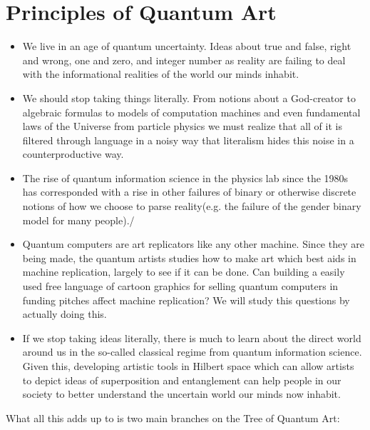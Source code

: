 \documentclass[11pt]{article}
\begin{document}
\section{
Principles of Quantum Art}
\begin{itemize}

    \item
We live in an age of quantum uncertainty.  Ideas about true and false, right and wrong, one and zero, and integer number as reality are failing to deal with the informational realities of the world our minds inhabit. 
    
    \item
We should stop taking things literally.  From notions about a God-creator to algebraic formulas to models of computation machines and even fundamental laws of the Universe from particle physics we must realize that all of it is filtered through language in a noisy way that literalism hides this noise in a counterproductive way.
    \item
The rise of quantum information science in the physics lab since the 1980s has corresponded with a rise in other failures of binary or otherwise discrete notions of how we choose to parse reality(e.g. the failure of the gender binary model for many people)./
    \item

        Quantum computers are art replicators like any other machine.  Since they are being made, the quantum artists studies how to make art which best aids in machine replication, largely to see if it can be done.  Can building a easily used free language of cartoon graphics for selling quantum computers in funding pitches affect machine replication?  We will study this questions by actually doing this.
    
    \item

        If we stop taking ideas literally, there is much to learn about the direct world around us in the so-called classical regime from quantum information science.  Given this, developing artistic tools in Hilbert space which can allow artists to depict ideas of superposition and entanglement can help people in our society to better understand the uncertain world our minds now inhabit.  
    
\end{itemize}


What all this adds up to is two main branches on the Tree of Quantum Art:
\end{document}
